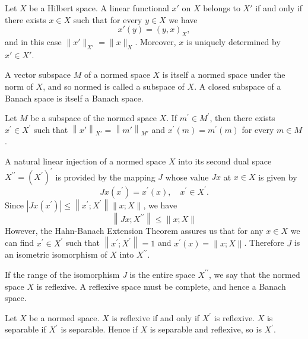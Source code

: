 \begin{theorem}
  Let $X$ be a Hilbert space. A linear functional $x'$ on $X$ belongs to $X'$
  if and only if there exists $x\in X$ such that for every $y\in X$ we have
  \[x'(y) = (y,x)_X,\]
  and in this case $\|x'\|_{X'} = \|x\|_X$.
  Moreover, $x$ is uniquely determined by $x'\in X'$.
\end{theorem}


A vector subspace $M$ of a normed space $X$ is itself a normed space under the norm of $X$, and so normed is called a subspace of $X$. A closed subspace of a Banach space is itself a Banach space.


\begin{theorem}
  Let $M$ be a subspace of the normed space $X$. If $m^{\prime} \in M^{\prime}$,
  then there exists $x^{\prime} \in X^{\prime}$ such that 
  $\left\|x'\right\|_{X'} = \left\|m'\right\|_{M'}$
  and $x^{\prime}(m)=m^{\prime}(m)$ for every $m \in M$.
\end{theorem}


\begin{para}
  A natural linear injection of a normed space $X$ into its second dual space $X^{\prime \prime}=\left(X^{\prime}\right)^{\prime}$ is provided by the mapping $J$ whose value $J x$ at $x \in X$ is given by
  \[
  J x\left(x^{\prime}\right)=x^{\prime}(x), \quad x^{\prime} \in X^{\prime}.
  \]
  Since $\left|J x\left(x^{\prime}\right)\right| \leq\left\|x^{\prime} ; X^{\prime}\right\|\|x ; X\|$, we have
  \[
  \left\|J x ; X^{\prime \prime}\right\| \leq\|x ; X\|
  \]
  However, the Hahn-Banach Extension Theorem assures us that for any $x \in X$ we can find $x^{\prime} \in X^{\prime}$ such that $\left\|x^{\prime} ; X^{\prime}\right\|=1$ and $x^{\prime}(x)=\|x ; X\|$. Therefore $J$ is an isometric isomorphism of $X$ into $X^{\prime \prime}$.

  If the range of the isomorphism $J$ is the entire space $X^{\prime \prime}$, we say that the normed space $X$ is reflexive. A reflexive space must be complete, and hence a Banach space.
\end{para}


\begin{theorem}
  Let $X$ be a normed space. $X$ is reflexive if and only if $X^{\prime}$ is reflexive. $X$ is separable if $X^{\prime}$ is separable. Hence if $X$ is separable and reflexive, so is $X^{\prime}$.
\end{theorem}


